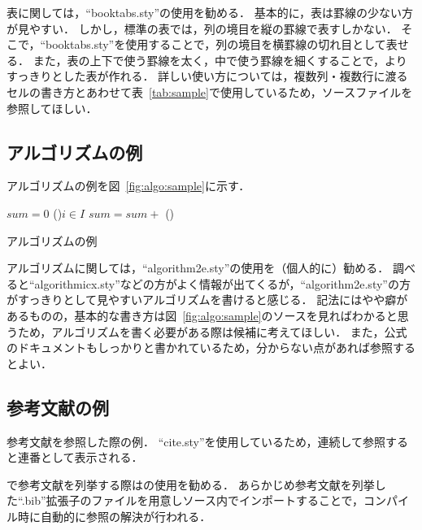 \documentclass{ipsj}
\newcommand{\Fig}[1]{図~#1}
\newcommand{\Tab}[1]{表~#1}
\begin{document}
  表に関しては，``booktabs.sty''の使用を勧める．
  基本的に，表は罫線の少ない方が見やすい．
  しかし，{\LaTeXe}標準の表では，列の境目を縦の罫線で表すしかない．
  そこで，``booktabs.sty''を使用することで，列の境目を横罫線の切れ目として表せる．
  また，表の上下で使う罫線を太く，中で使う罫線を細くすることで，よりすっきりとした表が作れる．
  詳しい使い方については，複数列・複数行に渡るセルの書き方とあわせて\Tab{\ref{tab:sample}}で使用しているため，ソースファイルを参照してほしい．
  
  \subsection{アルゴリズムの例}
  アルゴリズムの例を\Fig{\ref{fig:algo:sample}}に示す．
  
    \begin{algorithm}[t]
    \small
    \DontPrintSemicolon
    $sum = 0$\;
    \ForEach(){$i \in I$}{
      $sum = sum +$ 
    }
   	\BlankLine
   	\Proc(){}{
    }
    \caption{アルゴリズムの例}
    \label{fig:algo:sample}
    \end{algorithm}
  
  アルゴリズムに関しては，``algorithm2e.sty''の使用を（個人的に）勧める．
  調べると``algorithmicx.sty''などの方がよく情報が出てくるが，``algorithm2e.sty''の方がすっきりとして見やすいアルゴリズムを書けると感じる．
  記法にはやや癖があるものの，基本的な書き方は\Fig{\ref{fig:algo:sample}}のソースを見ればわかると思うため，アルゴリズムを書く必要がある際は候補に考えてほしい．
  また，公式のドキュメントもしっかりと書かれているため，分からない点があれば参照するとよい．
  
  \subsection{参考文献の例}
  参考文献を参照した際の例\cite{book:Aho2006,icde:Diao2002,new-gen-comp:Kowalski1989,tech:Hopcroft1971,url:grep}．
  ``cite.sty''を使用しているため，連続して参照すると連番として表示される．
  
  {\LaTeXe}で参考文献を列挙する際は{\BibTeX}の使用を勧める．
  あらかじめ参考文献を列挙した``.bib''拡張子のファイルを用意し{\LaTeXe}ソース内でインポートすることで，コンパイル時に自動的に参照の解決が行われる．
  
\end{document}
